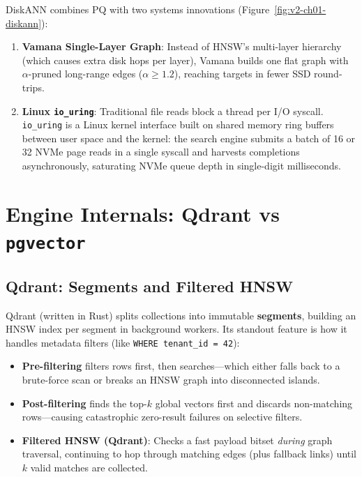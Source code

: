 \begin{underthehoodbox}
DiskANN combines PQ with two systems innovations (Figure~\ref{fig:v2-ch01-diskann}):
\begin{enumerate}
  \item \textbf{Vamana Single-Layer Graph}: Instead of HNSW's multi-layer hierarchy (which causes extra disk hops per layer), Vamana builds one flat graph with $\alpha$-pruned long-range edges ($\alpha \ge 1.2$), reaching targets in fewer SSD round-trips.
  \item \textbf{Linux \texttt{io\_uring}}: Traditional file reads block a thread per I/O syscall. \texttt{io\_uring} is a Linux kernel interface built on shared memory ring buffers between user space and the kernel: the search engine submits a batch of 16 or 32 NVMe page reads in a single syscall and harvests completions asynchronously, saturating NVMe queue depth in single-digit milliseconds.
\end{enumerate}
\end{underthehoodbox}

\section{Engine Internals: Qdrant vs \texttt{pgvector}}

\subsection{Qdrant: Segments and Filtered HNSW}
Qdrant (written in Rust) splits collections into immutable \textbf{segments}, building an HNSW index per segment in background workers. Its standout feature is how it handles metadata filters (like \texttt{WHERE tenant\_id = 42}):
\begin{itemize}[leftmargin=18pt]
  \item \textbf{Pre-filtering} filters rows first, then searches—which either falls back to a brute-force scan or breaks an HNSW graph into disconnected islands.
  \item \textbf{Post-filtering} finds the top-$k$ global vectors first and discards non-matching rows—causing catastrophic zero-result failures on selective filters.
  \item \textbf{Filtered HNSW (Qdrant)}: Checks a fast payload bitset \emph{during} graph traversal, continuing to hop through matching edges (plus fallback links) until $k$ valid matches are collected.
\end{itemize}

